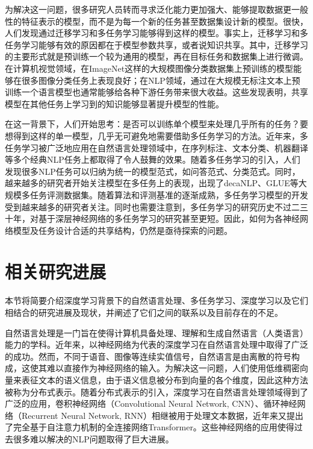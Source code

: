 为解决这一问题，很多研究人员转而寻求泛化能力更加强大、能够提取数据更一般性的特征表示的模型，而不是为每一个新的任务甚至数据集设计新的模型。很快，人们发现通过迁移学习和多任务学习能够得到这样的模型。事实上，迁移学习和多任务学习能够有效的原因都在于模型参数共享，或者说知识共享。其中，迁移学习的主要形式就是预训练一个较为通用的模型，再在目标任务和数据集上进行微调。在计算机视觉领域，在ImageNet\cite{DBLP:conf/cvpr/DengDSLL009}这样的大规模图像分类数据集上预训练的模型能够在很多图像分类任务上表现良好；在NLP领域，通过在大规模无标注文本上预训练一个语言模型也通常能够给各种下游任务带来很大收益\cite{DBLP:conf/naacl/PetersNIGCLZ18}\cite{radford2018improving}。这些发现表明，共享模型在其他任务上学习到的知识能够显著提升模型的性能。

在这一背景下，人们开始思考：是否可以训练单个模型来处理几乎所有的任务？要想得到这样的单一模型，几乎无可避免地需要借助多任务学习的方法。近年来，多任务学习被广泛地应用在自然语言处理领域中，在序列标注、文本分类、机器翻译等多个经典NLP任务上都取得了令人鼓舞的效果。随着多任务学习的引入，人们发现很多NLP任务可以归纳为统一的模型范式，如问答范式\cite{mccann2018natural}、分类范式\cite{radford2018improving}\cite{devlin2018bert}。同时，越来越多的研究者开始关注模型在多任务上的表现，出现了decaNLP\cite{mccann2018natural}、GLUE\cite{DBLP:conf/emnlp/WangSMHLB18}等大规模多任务评测数据集。随着算法和评测基准的逐渐成熟，多任务学习模型的开发受到越来越多的研究者关注。同时也需要注意到，多任务学习的研究历史不过二三十年，对基于深层神经网络的多任务学习的研究甚至更短。因此，如何为各神经网络模型及任务设计合适的共享结构，仍然是亟待探索的问题。

\section{相关研究进展}

本节将简要介绍深度学习背景下的自然语言处理、多任务学习、深度学习以及它们相结合的研究进展及现状，并阐述了它们之间的联系以及目前存在的不足。

自然语言处理是一门旨在使得计算机具备处理、理解和生成自然语言（人类语言）能力的学科。近年来，以神经网络为代表的深度学习在自然语言处理中取得了广泛的成功\cite{DBLP:journals/jmlr/CollobertWBKKK11}\cite{DBLP:conf/emnlp/BordesCW14}\cite{DBLP:conf/acl/JeanCMB15}\cite{DBLP:conf/nips/SutskeverVL14}。然而，不同于语音、图像等连续实值信号，自然语言是由离散的符号构成，这使其难以直接作为神经网络的输入。为解决这一问题，人们使用低维稠密向量来表征文本的语义信息\cite{DBLP:conf/nips/MikolovSCCD13}\cite{DBLP:conf/emnlp/PenningtonSM14}，由于语义信息被分布到向量的各个维度，因此这种方法被称为分布式表示。随着分布式表示的引入，深度学习在自然语言处理领域得到了广泛的应用，卷积神经网络（Convolutional Neural Network, CNN）、循环神经网络（Recurrent Neural Network, RNN）相继被用于处理文本数据，近年来又提出了完全基于自注意力机制的全连接网络Transformer。这些神经网络的应用使得过去很多难以解决的NLP问题取得了巨大进展。

